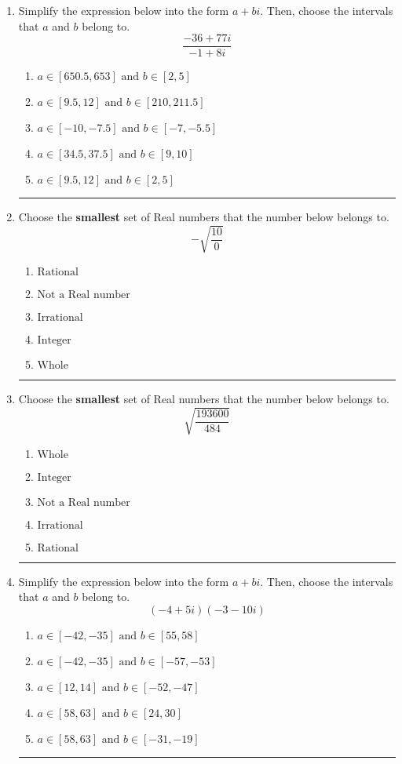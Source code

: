 \documentclass[14pt]{extbook}
\newcommand{\litem}[1]{\item#1\hspace*{-1cm}\rule{\textwidth}{0.4pt}}
\begin{document}
\begin{enumerate}
{\begin{enumerate}[label=\Alph*.]
\end{enumerate} }
\litem{
Simplify the expression below into the form $a+bi$. Then, choose the intervals that $a$ and $b$ belong to.\[ \frac{-36 + 77 i}{-1 + 8 i} \]\begin{enumerate}[label=\Alph*.]
\item \( a \in [650.5, 653] \text{ and } b \in [2, 5] \)
\item \( a \in [9.5, 12] \text{ and } b \in [210, 211.5] \)
\item \( a \in [-10, -7.5] \text{ and } b \in [-7, -5.5] \)
\item \( a \in [34.5, 37.5] \text{ and } b \in [9, 10] \)
\item \( a \in [9.5, 12] \text{ and } b \in [2, 5] \)

\end{enumerate} }
\litem{
Choose the \textbf{smallest} set of Real numbers that the number below belongs to.\[ -\sqrt{\frac{10}{0}} \]\begin{enumerate}[label=\Alph*.]
\item \( \text{Rational} \)
\item \( \text{Not a Real number} \)
\item \( \text{Irrational} \)
\item \( \text{Integer} \)
\item \( \text{Whole} \)

\end{enumerate} }
\litem{
Choose the \textbf{smallest} set of Real numbers that the number below belongs to.\[ \sqrt{\frac{193600}{484}} \]\begin{enumerate}[label=\Alph*.]
\item \( \text{Whole} \)
\item \( \text{Integer} \)
\item \( \text{Not a Real number} \)
\item \( \text{Irrational} \)
\item \( \text{Rational} \)

\end{enumerate} }
\litem{
Simplify the expression below into the form $a+bi$. Then, choose the intervals that $a$ and $b$ belong to.\[ (-4 + 5 i)(-3 - 10 i) \]\begin{enumerate}[label=\Alph*.]
\item \( a \in [-42, -35] \text{ and } b \in [55, 58] \)
\item \( a \in [-42, -35] \text{ and } b \in [-57, -53] \)
\item \( a \in [12, 14] \text{ and } b \in [-52, -47] \)
\item \( a \in [58, 63] \text{ and } b \in [24, 30] \)
\item \( a \in [58, 63] \text{ and } b \in [-31, -19] \)


\end{enumerate}}
\end{enumerate}
\end{document}
